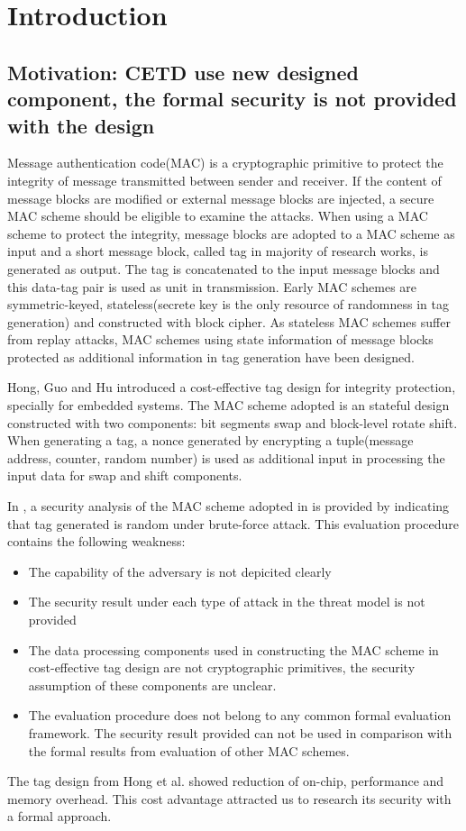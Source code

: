 \documentclass{article}
\begin{document}
\section{Introduction}
\subsection{Motivation: CETD use new designed component, the formal security is not provided with the design}
Message authentication code(MAC) is a cryptographic primitive to protect the integrity of message transmitted between sender and receiver. If the content of message blocks are modified or external message blocks are injected, a secure MAC scheme should be eligible to examine the attacks. When using a MAC scheme to protect the integrity, message blocks are adopted to a MAC scheme as input and a short message block, called tag in majority of research works, is generated as output. The tag is concatenated to the input message blocks and this data-tag pair is used as unit in transmission. Early MAC schemes are symmetric-keyed, stateless(secrete key is the only resource of randomness in tag generation) and constructed with block cipher. As stateless MAC schemes suffer from replay attacks, MAC schemes using state information of message blocks protected as additional information in tag generation have been designed.

Hong, Guo and Hu \cite{keylist}introduced a cost-effective tag design for integrity protection, specially for embedded systems. The MAC scheme adopted is an stateful design constructed with two components: bit segments swap and block-level rotate shift. When generating a tag, a nonce generated by encrypting a tuple(message address, counter, random number) is used as additional input in processing the input data for swap and shift components. 

In \cite{keylist}, a security analysis of the MAC scheme adopted in is provided by indicating that tag generated is random under brute-force attack. This evaluation procedure contains the following weakness:
\begin{itemize}
	\item The capability of the adversary is not depicited clearly
	\item The security result under each type of attack in the threat model is not provided
	\item The data processing components used in constructing the MAC scheme in cost-effective tag design are not cryptographic primitives, the security assumption of these components are unclear.
	\item The evaluation procedure does not belong to any common formal evaluation framework. The security result provided can not be used in comparison with the formal results from evaluation of other MAC schemes.
\end{itemize}
The tag design from Hong et al. showed  reduction of on-chip, performance and memory overhead. This cost advantage attracted us to research its security with a formal approach.
\end{document}
